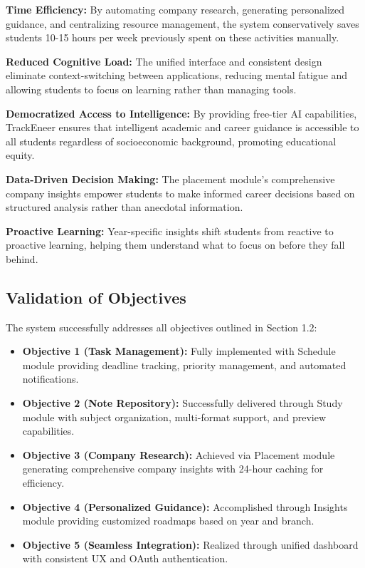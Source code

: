 \documentclass[12pt]{article}
\begin{document}
\textbf{Time Efficiency:} By automating company research, generating personalized guidance, and centralizing resource management, the system conservatively saves students 10-15 hours per week previously spent on these activities manually.

\textbf{Reduced Cognitive Load:} The unified interface and consistent design eliminate context-switching between applications, reducing mental fatigue and allowing students to focus on learning rather than managing tools.

\textbf{Democratized Access to Intelligence:} By providing free-tier AI capabilities, TrackEneer ensures that intelligent academic and career guidance is accessible to all students regardless of socioeconomic background, promoting educational equity.

\textbf{Data-Driven Decision Making:} The placement module's comprehensive company insights empower students to make informed career decisions based on structured analysis rather than anecdotal information.

\textbf{Proactive Learning:} Year-specific insights shift students from reactive to proactive learning, helping them understand what to focus on before they fall behind.

\subsection{Validation of Objectives}
The system successfully addresses all objectives outlined in Section 1.2:

\begin{itemize}
    \item \textbf{Objective 1 (Task Management):} Fully implemented with Schedule module providing deadline tracking, priority management, and automated notifications.
    
    \item \textbf{Objective 2 (Note Repository):} Successfully delivered through Study module with subject organization, multi-format support, and preview capabilities.
    
    \item \textbf{Objective 3 (Company Research):} Achieved via Placement module generating comprehensive company insights with 24-hour caching for efficiency.
    
    \item \textbf{Objective 4 (Personalized Guidance):} Accomplished through Insights module providing customized roadmaps based on year and branch.
    
    \item \textbf{Objective 5 (Seamless Integration):} Realized through unified dashboard with consistent UX and OAuth authentication.
\end{itemize}
\end{document}
